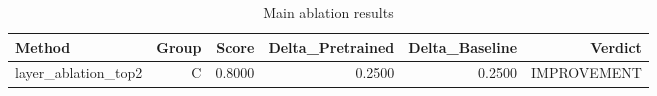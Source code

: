 \begin{table}[htbp]
\centering
\caption{Main ablation results}
\label{tab:main-results}
\begin{tabular}{lrrrrr}
\toprule
\textbf{Method} & \textbf{Group} & \textbf{Score} & \textbf{Delta\_Pretrained} & \textbf{Delta\_Baseline} & \textbf{Verdict} \\
\midrule
layer\_ablation\_top2 & C & 0.8000 & 0.2500 & 0.2500 & IMPROVEMENT \\
\bottomrule
\end{tabular}
\end{table}